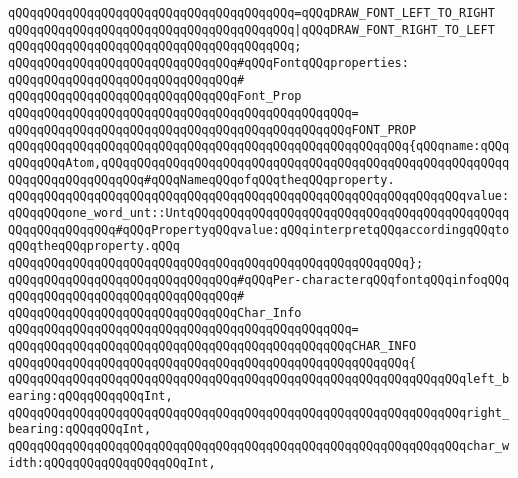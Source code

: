 \verb|qQQqqQQqqQQqqQQqqQQqqQQqqQQqqQQqqQQqqQQq=qQQqDRAW_FONT_LEFT_TO_RIGHT|\newline
\verb|qQQqqQQqqQQqqQQqqQQqqQQqqQQqqQQqqQQqqQQq|\verb#|qQQqDRAW_FONT_RIGHT_TO_LEFT#\newline
\verb|qQQqqQQqqQQqqQQqqQQqqQQqqQQqqQQqqQQqqQQq;|\newline
\newline
\verb|qQQqqQQqqQQqqQQqqQQqqQQqqQQqqQQq#qQQqFontqQQqproperties:|\newline
\verb|qQQqqQQqqQQqqQQqqQQqqQQqqQQqqQQq#|\newline
\verb|qQQqqQQqqQQqqQQqqQQqqQQqqQQqqQQqFont_Prop|\newline
\verb|qQQqqQQqqQQqqQQqqQQqqQQqqQQqqQQqqQQqqQQqqQQqqQQq=|\newline
\verb|qQQqqQQqqQQqqQQqqQQqqQQqqQQqqQQqqQQqqQQqqQQqqQQqFONT_PROP|\newline
\verb|qQQqqQQqqQQqqQQqqQQqqQQqqQQqqQQqqQQqqQQqqQQqqQQqqQQqqQQq{qQQqname:qQQqqQQqqQQqAtom,qQQqqQQqqQQqqQQqqQQqqQQqqQQqqQQqqQQqqQQqqQQqqQQqqQQqqQQqqQQqqQQqqQQqqQQqqQQq#qQQqNameqQQqofqQQqtheqQQqproperty.|\newline
\verb|qQQqqQQqqQQqqQQqqQQqqQQqqQQqqQQqqQQqqQQqqQQqqQQqqQQqqQQqqQQqqQQqvalue:qQQqqQQqone_word_unt::UntqQQqqQQqqQQqqQQqqQQqqQQqqQQqqQQqqQQqqQQqqQQqqQQqqQQqqQQqqQQq#qQQqPropertyqQQqvalue:qQQqinterpretqQQqaccordingqQQqtoqQQqtheqQQqproperty.qQQq|\newline
\verb|qQQqqQQqqQQqqQQqqQQqqQQqqQQqqQQqqQQqqQQqqQQqqQQqqQQqqQQq};|\newline
\newline
\verb|qQQqqQQqqQQqqQQqqQQqqQQqqQQqqQQq#qQQqPer-characterqQQqfontqQQqinfoqQQq|\newline
\verb|qQQqqQQqqQQqqQQqqQQqqQQqqQQqqQQq#|\newline
\verb|qQQqqQQqqQQqqQQqqQQqqQQqqQQqqQQqChar_Info|\newline
\verb|qQQqqQQqqQQqqQQqqQQqqQQqqQQqqQQqqQQqqQQqqQQqqQQq=|\newline
\verb|qQQqqQQqqQQqqQQqqQQqqQQqqQQqqQQqqQQqqQQqqQQqqQQqCHAR_INFO|\newline
\verb|qQQqqQQqqQQqqQQqqQQqqQQqqQQqqQQqqQQqqQQqqQQqqQQqqQQqqQQq{|\newline
\verb|qQQqqQQqqQQqqQQqqQQqqQQqqQQqqQQqqQQqqQQqqQQqqQQqqQQqqQQqqQQqqQQqleft_bearing:qQQqqQQqqQQqInt,|\newline
\verb|qQQqqQQqqQQqqQQqqQQqqQQqqQQqqQQqqQQqqQQqqQQqqQQqqQQqqQQqqQQqqQQqright_bearing:qQQqqQQqInt,|\newline
\verb|qQQqqQQqqQQqqQQqqQQqqQQqqQQqqQQqqQQqqQQqqQQqqQQqqQQqqQQqqQQqqQQqchar_width:qQQqqQQqqQQqqQQqqQQqInt,|\newline
